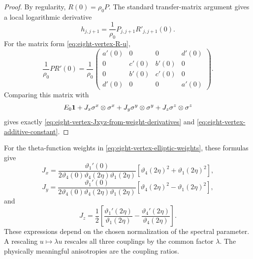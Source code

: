 \begin{proof}
By regularity, $R(0)=\rho_0P$.  The standard transfer-matrix argument gives a
local logarithmic derivative
\begin{equation}
\label{eq:eight-vertex-local-h-P-Rprime}
    h_{j,j+1}=\frac{1}{\rho_0}P_{j,j+1}R'_{j,j+1}(0).
\end{equation}
For the matrix form \cref{eq:eight-vertex-R-u},
\begin{equation}
\label{eq:eight-vertex-PRprime-matrix}
    \frac{1}{\rho_0}PR'(0)
    =\frac{1}{\rho_0}
    \begin{pmatrix}
        a'(0)&0&0&d'(0)\\
        0&c'(0)&b'(0)&0\\
        0&b'(0)&c'(0)&0\\
        d'(0)&0&0&a'(0)
    \end{pmatrix}.
\end{equation}
Comparing this matrix with
\begin{equation}
\label{eq:eight-vertex-local-XYZ-comparison}
    E_0\mathbf{1}
    +J_x\sigma^x\otimes\sigma^x
    +J_y\sigma^y\otimes\sigma^y
    +J_z\sigma^z\otimes\sigma^z
\end{equation}
gives exactly \cref{eq:eight-vertex-Jxyz-from-weight-derivatives} and
\cref{eq:eight-vertex-additive-constant}.
\end{proof}

For the theta-function weights in \cref{eq:eight-vertex-elliptic-weights}, these
formulas give
\begin{equation}
\label{eq:eight-vertex-JxJy-theta}
    J_x
    =
    \frac{\vartheta_1'(0)}{2\vartheta_4(0)\vartheta_4(2\eta)\vartheta_1(2\eta)}
    \left[\vartheta_4(2\eta)^2+\vartheta_1(2\eta)^2\right],
\end{equation}
\begin{equation}
\label{eq:eight-vertex-Jy-theta}
    J_y
    =
    \frac{\vartheta_1'(0)}{2\vartheta_4(0)\vartheta_4(2\eta)\vartheta_1(2\eta)}
    \left[\vartheta_4(2\eta)^2-\vartheta_1(2\eta)^2\right],
\end{equation}
and
\begin{equation}
\label{eq:eight-vertex-Jz-theta}
    J_z
    =
    \frac12
    \left[
        \frac{\vartheta_1'(2\eta)}{\vartheta_1(2\eta)}
        -
        \frac{\vartheta_4'(2\eta)}{\vartheta_4(2\eta)}
    \right].
\end{equation}
These expressions depend on the chosen normalization of the spectral parameter.
A rescaling $u\mapsto\lambda u$ rescales all three couplings by the common factor
$\lambda$.  The physically meaningful anisotropies are the coupling ratios.


